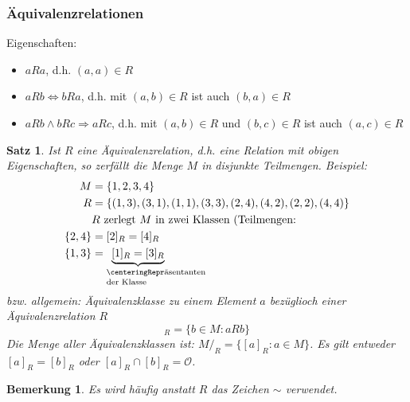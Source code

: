 \documentclass[12pt,a4paper]{report}%
\newtheorem{satz}{Satz}[section]
\newtheorem{bem}{Bemerkung}[section]
\numberwithin{equation}{section}
\def\colBlue#1{\begingroup\color{NavyBlue}{#1}\endgroup}
\numberwithin{equation}{subsection}
\begin{document}
	\subsubsection{Äquivalenzrelationen}
	  Eigenschaften:
	  \begin{itemize}
	    \item $aRa$, d.h. $(a,a) \in R$ \colBlue{(Reflexivität)}
	    \item $aRb \Leftrightarrow bRa$, d.h. mit $(a,b)\in R$ ist auch $(b,a) \in R$ \colBlue{(Symmetrie)}
	    \item $aRb \land bRc \Rightarrow aRc$, d.h. mit $(a,b) \in R$ und $(b,c) \in R$ ist auch $(a,c) \in R$ \colBlue{(Transitivität)}
	  \end{itemize}
	  \begin{satz}
	    Ist $R$ eine Äquivalenzrelation, d.h. eine Relation mit obigen Eigenschaften, so zerfällt die Menge $M$ in disjunkte Teilmengen. \newline
	    Beispiel:
	    \begin{align*}
	      M &= \lbrace 1,2,3,4\rbrace \\
	      R &= \lbrace(1,3),(3,1),(1,1),(3,3),(2,4),(4,2),(2,2),(4,4)\rbrace\\
	      &\text{$R$ zerlegt $M$ in zwei Klassen (Teilmengen:}\\
	      \lbrace 2,4\rbrace &= [2]_R = [4]_R\\
	      \lbrace 1,3\rbrace &= \underbrace{[1]_R = [3]_R}_{\text{\parbox{2cm}{\centering%
Repräsentanten \\[-1ex]der Klasse}}}
	    \end{align*}
	    bzw. allgemein: Äquivalenzklasse zu einem Element $a$ bezüglioch einer Äquivalenzrelation $R$
	    \begin{equation*}
	      [a]_R = \lbrace b \in M : aRb\rbrace
	    \end{equation*}
	    Die Menge aller Äquivalenzklassen ist: $M/_R = \lbrace[a]_R: a\in M\rbrace$. Es gilt entweder $[a]_R = [b]_R$ oder $[a]_R \cap [b]_R = \mathcal{O}$.
	  \end{satz}
	  \begin{bem}
	    Es wird häufig anstatt $R$ das Zeichen $\sim$ verwendet.
	  \end{bem}
\end{document}
